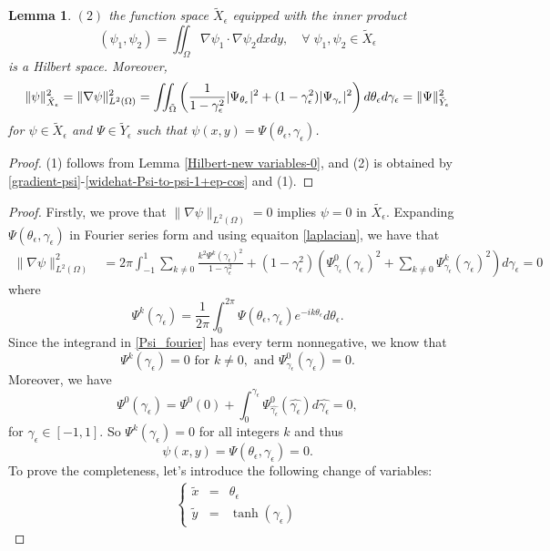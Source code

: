 \documentclass[1 [leqno, 11pt]{amsart}
\numberwithin{equation}{section}
\let\ep=\epsilon
\newtheorem{lemma}[Theorem]{Lemma}
\begin{document}
\begin{CJK*}{GBK}{song}
\begin{lemma}
$(2)$
the function space $\tilde{X}_\ep$ equipped with the inner product
$$(\psi_1, \psi_2) = \iint_{\Omega} \nabla \psi_1 \cdot \nabla \psi_2 dxdy, \quad \forall\; \psi_1, \psi_2 \in \tilde{X}_\ep$$
 is a Hilbert space. Moreover,
\begin{align}\label{Psi-psi-norm-eq} \| \psi\|_{\tilde X_\epsilon}^2= \| \nabla \psi\|_{L^2(\Omega)}^2=\iint_{\tilde \Omega}\left({1\over1-\gamma_\ep^2}|\Psi_{\theta_\ep}|^2+(1-\gamma_\ep^2)|\Psi_{\gamma_\ep}|^2\right)d \theta_\ep d\gamma_\ep=\|\Psi\|_{\tilde Y_\epsilon}^2
\end{align}
for   $\psi \in \tilde{X}_\ep$ and $\Psi \in \tilde{Y}_\ep$ such that $\psi(x,y) = \Psi(\theta_\ep, \gamma_\ep)$.
\end{lemma}
\begin{proof}
(1) follows from Lemma \ref{Hilbert-new variables-0}, and (2) is obtained by \eqref{gradient-psi}-\eqref{widehat-Psi-to-psi-1+ep-cos} and (1).
\end{proof}
\begin{proof}
Firstly, we prove that $\|\nabla \psi\|_{L^2(\Omega)} = 0$ implies $\psi = 0$ in $\tilde{X_\ep}$. Expanding $\Psi(\theta_\ep, \gamma_\ep)$ in Fourier series form and using equaiton \eqref{laplacian}, we have that
\begin{align}\label{Psi_fourier}
\|\nabla \psi\|_{L^2(\Omega)}^2
& = 2\pi \int_{-1}^{1} \sum_{k \neq 0} \frac{k^2 \Psi^k(\gamma_\ep)^2}{1-\gamma_\ep^2} + (1-\gamma_\ep^2) \left( \Psi^0_{\gamma_\ep}(\gamma_\ep)^2 + \sum_{k \neq 0}  \Psi^k_{\gamma_\ep}(\gamma_\ep)^2 \right) d \gamma_\ep = 0
\end{align}
where $$\Psi^k(\gamma_\ep) = \frac{1}{2\pi} \int_0^{2\pi} \Psi(\theta_\ep, \gamma_\ep) e^{-ik\theta_\ep} d \theta_\ep.$$
Since the integrand in \eqref{Psi_fourier} has every term nonnegative, we know that
$$ \Psi^k(\gamma_\ep) = 0 \text{ for } k \neq 0, \text{ and } \Psi^0_{\gamma_\ep}(\gamma_\ep) = 0.$$
Moreover, we have $$\Psi^0(\gamma_\ep) = \Psi^0(0) + \int_0^{\gamma_\ep} \Psi^0_{\hat{\gamma_\ep}}(\hat{\gamma_\ep})d\hat{\gamma_\ep} = 0,$$
for $\gamma_\ep \in [-1, 1]$.
So $\Psi^k(\gamma_\ep) = 0$ for all integers $k$ and thus $$\psi(x,y) = \Psi(\theta_\ep, \gamma_\ep) = 0.$$
To prove the completeness, let's introduce the following change of variables:
\begin{align}\label{change of variables2}
\left\{ \begin{array}{ccc} \tilde{x}  & = & \theta_\ep
\\ \tilde{y}  & = & \tanh(\gamma_\ep) \end{array} \right.

\end{align}
\end{proof}
\end{CJK*}
\end{document}
